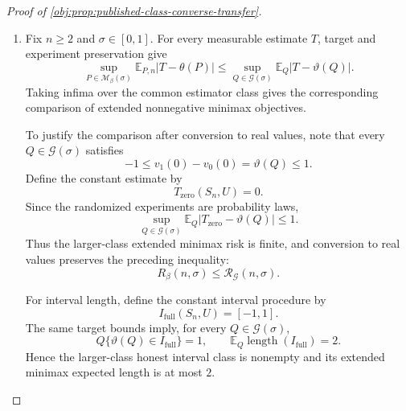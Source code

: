 \documentclass[11pt]{article}
\begin{document}
\begin{proof}[Proof of \cref{obj:prop:published-class-converse-transfer}]
\begin{enumerate}
The embedding leaves the coordinates used by the observation map unchanged. Consequently,
\[
\vartheta(Q)=v_1(0)-v_0(0)=\theta(P),
\qquad
Q\circ(R,A,B)^{-1}=P_{\mathrm{obs}},
\]
and hence, for every integer \(n\ge0\),
\[
\bigl(Q\circ(R,A,B)^{-1}\bigr)^{\otimes n}
\otimes\operatorname{Unif}[0,1]
=
P_{\mathrm{obs}}^{\otimes n}
\otimes\operatorname{Unif}[0,1]
=
\mathbb P_{P,n}.
\]
At \(n=0\), the sample factor is the empty product probability law, so the identity also covers that case.

\item Fix \(n\ge2\) and \(\sigma\in[0,1]\). For every measurable estimate \(T\), target and experiment preservation give
\[
\sup_{P\in\mathcal M_\beta(\sigma)}
\mathbb E_{P,n}|T-\theta(P)|
\le
\sup_{Q\in\mathcal G(\sigma)}
\mathbb E_Q|T-\vartheta(Q)|.
\]
Taking infima over the common estimator class gives the corresponding comparison of extended nonnegative minimax objectives.

To justify the comparison after conversion to real values, note that every \(Q\in\mathcal G(\sigma)\) satisfies
\[
-1\le v_1(0)-v_0(0)=\vartheta(Q)\le1.
\]
Define the constant estimate by
\[
T_{\mathrm{zero}}(S_n,U)=0.
\]
Since the randomized experiments are probability laws,
\[
\sup_{Q\in\mathcal G(\sigma)}
\mathbb E_Q|T_{\mathrm{zero}}-\vartheta(Q)|
\le1.
\]
Thus the larger-class extended minimax risk is finite, and conversion to real values preserves the preceding inequality:
\[
R_\beta(n,\sigma)\le\mathcal R_{\mathcal G}(n,\sigma).
\]

For interval length, define the constant interval procedure by
\[
I_{\mathrm{full}}(S_n,U)=[-1,1].
\]
The same target bounds imply, for every \(Q\in\mathcal G(\sigma)\),
\[
Q\{\vartheta(Q)\in I_{\mathrm{full}}\}=1,
\qquad
\mathbb E_Q\operatorname{length}(I_{\mathrm{full}})=2.
\]
Hence the larger-class honest interval class is nonempty and its extended minimax expected length is at most \(2\).


\end{enumerate}
\end{proof}
\end{document}
